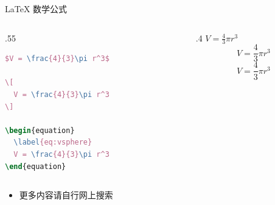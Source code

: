 \documentclass{beamer}
\begin{document}
\begin{frame}[fragile]{\LaTeX{} 数学公式}
    \begin{columns}
        \begin{column}{.55\textwidth}
\begin{lstlisting}[language=TeX]
$V = \frac{4}{3}\pi r^3$

\[
  V = \frac{4}{3}\pi r^3
\]

\begin{equation}
  \label{eq:vsphere}
  V = \frac{4}{3}\pi r^3
\end{equation}
\end{lstlisting}
        \end{column}
        \begin{column}{.4\textwidth}
            $V = \frac{4}{3}\pi r^3$
            \[
                V = \frac{4}{3}\pi r^3
            \]
            \begin{equation}
                \label{eq:vsphere}
                V = \frac{4}{3}\pi r^3
            \end{equation}
        \end{column}
    \end{columns}
    \begin{itemize}
        \item 更多内容请自行网上搜索
    \end{itemize}
\end{frame}
\end{document}
